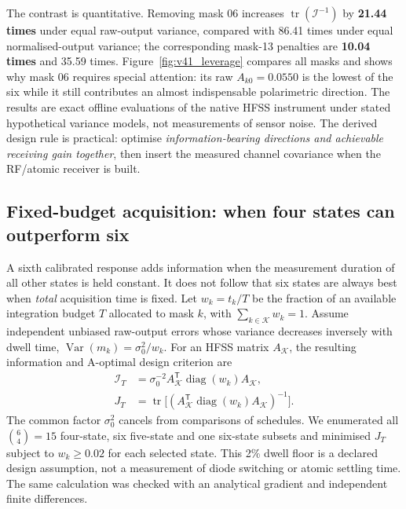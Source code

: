 \documentclass{ieeeaccess}
\begin{document}
The contrast is quantitative. Removing mask 06 increases $\operatorname{tr}(\mathcal I^{-1})$ by \textbf{21.44 times} under equal raw-output variance, compared with 86.41 times under equal normalised-output variance; the corresponding mask-13 penalties are \textbf{10.04 times} and 35.59 times. Figure~\ref{fig:v41_leverage} compares all masks and shows why mask 06 requires special attention: its raw $A_{k0}=0.0550$ is the lowest of the six while it still contributes an almost indispensable polarimetric direction. The results are exact offline evaluations of the native HFSS instrument under stated hypothetical variance models, not measurements of sensor noise. The derived design rule is practical: optimise \emph{information-bearing directions and achievable receiving gain together}, then insert the measured channel covariance when the RF/atomic receiver is built.



\subsection{Fixed-budget acquisition: when four states can outperform six}
\label{sec:fixedbudget}
A sixth calibrated response adds information when the measurement duration of all other states is held constant. It does not follow that six states are always best when \emph{total} acquisition time is fixed. Let $w_k=t_k/T$ be the fraction of an available integration budget $T$ allocated to mask $k$, with $\sum_{k\in\mathcal K}w_k=1$. Assume independent unbiased raw-output errors whose variance decreases inversely with dwell time, $\operatorname{Var}(m_k)=\sigma_0^2/w_k$. For an HFSS matrix $A_{\mathcal K}$, the resulting information and A-optimal design criterion are
\begin{equation}
\begin{aligned}
\mathcal I_T&=\sigma_0^{-2} A_{\mathcal K}^{\mathsf T}\!\operatorname{diag}(w_k)A_{\mathcal K},\\
J_T&=\operatorname{tr}\big[(A_{\mathcal K}^{\mathsf T}\operatorname{diag}(w_k)A_{\mathcal K})^{-1}\big].
\end{aligned}
\label{eq:dwell_information}
\end{equation}
The common factor $\sigma_0^2$ cancels from comparisons of schedules. We enumerated all $\binom64=15$ four-state, six five-state and one six-state subsets and minimised $J_T$ subject to $w_k\ge0.02$ for each selected state. This 2\% dwell floor is a declared design assumption, not a measurement of diode switching or atomic settling time. The same calculation was checked with an analytical gradient and independent finite differences.
\end{document}

